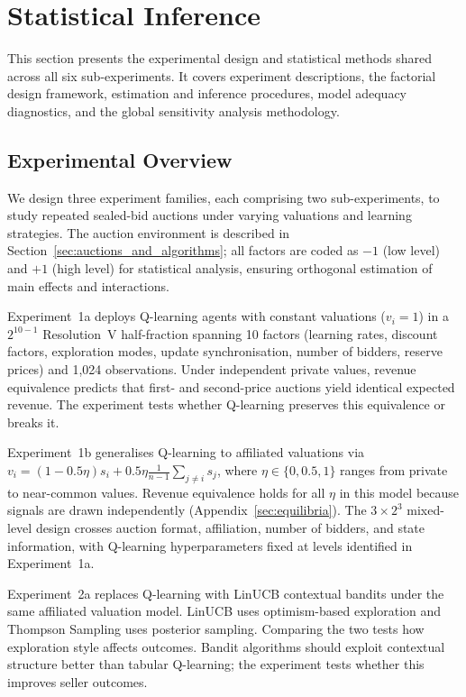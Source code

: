 \section{Statistical Inference}
\label{sec:inference}

This section presents the experimental design and statistical methods shared across all six sub-experiments. It covers experiment descriptions, the factorial design framework, estimation and inference procedures, model adequacy diagnostics, and the global sensitivity analysis methodology.

\subsection{Experimental Overview}
\label{sec:experiments}

We design three experiment families, each comprising two sub-experiments, to study repeated sealed-bid auctions under varying valuations and learning strategies. The auction environment is described in Section~\ref{sec:auctions_and_algorithms}; all factors are coded as $-1$ (low level) and $+1$ (high level) for statistical analysis, ensuring orthogonal estimation of main effects and interactions.

Experiment~1a deploys Q-learning agents with constant valuations ($v_i = 1$) in a $2^{10-1}$ Resolution~V half-fraction spanning 10 factors (learning rates, discount factors, exploration modes, update synchronisation, number of bidders, reserve prices) and 1{,}024 observations. Under independent private values, revenue equivalence \citep{Vickrey1961} predicts that first- and second-price auctions yield identical expected revenue. The experiment tests whether Q-learning preserves this equivalence or breaks it.

Experiment~1b generalises Q-learning to affiliated valuations via $v_i = (1 - 0.5\eta)s_i + 0.5\eta \frac{1}{n-1}\sum_{j \neq i} s_j$, where $\eta \in \{0, 0.5, 1\}$ ranges from private to near-common values. Revenue equivalence holds for all $\eta$ in this model because signals are drawn independently (Appendix~\ref{sec:equilibria}). The $3 \times 2^3$ mixed-level design crosses auction format, affiliation, number of bidders, and state information, with Q-learning hyperparameters fixed at levels identified in Experiment~1a.

Experiment~2a replaces Q-learning with LinUCB contextual bandits under the same affiliated valuation model. LinUCB uses optimism-based exploration and Thompson Sampling uses posterior sampling. Comparing the two tests how exploration style affects outcomes. Bandit algorithms should exploit contextual structure better than tabular Q-learning; the experiment tests whether this improves seller outcomes.

